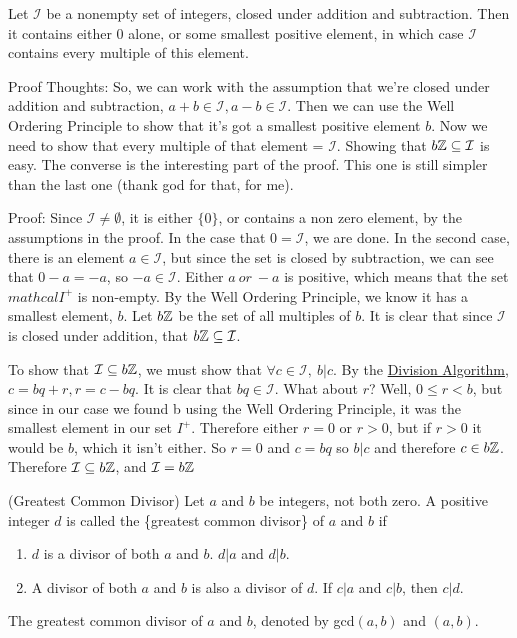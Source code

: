  Let \(\mathcal{I}\) be a nonempty set of integers, closed under addition and subtraction. Then it contains either 0 alone, or some smallest positive element, in which case \(\mathcal{I}\) contains every multiple of this element.

Proof Thoughts: So, we can work with the assumption that we're closed under addition and subtraction, \(a + b \in \mathcal{I}, a - b \in \mathcal{I}\). Then we can use the Well Ordering Principle to show that it's got a smallest positive element \(b\). Now we need to show that every multiple of that element = \(\mathcal{I}\). Showing that \(b\mathbb{Z} \subseteq \mathcal{I}\) is easy. The converse is the interesting part of the proof. This one is still simpler than the last one (thank god for that, for me).

Proof: Since \(\mathcal{I} \neq \emptyset\), it is either \(\{0\}\), or contains a non zero element, by the assumptions in the proof. In the case that \({0} = \mathcal{I}\), we are done. In the second case, there is an element \( a \in \mathcal{I}\), but since the set is closed by subtraction, we can see that \(0 - a = -a\), so \( -a \in \mathcal{I}\). Either \(a\ or\ -a \) is positive, which means that the set \(mathcal{I^+}\) is non-empty. By the Well Ordering Principle, we know it has a smallest element, \(b\). Let \(b\mathbb{Z}\) be the set of all multiples of \(b\). It is clear that since \(\mathcal{I}\) is closed under addition, that \(b\mathbb{Z} \subseteq \mathcal{I}\).

To show that \(\mathcal{I} \subseteq b\mathbb{Z}\), we must show that \(\forall c \in \mathcal{I},\ b|c\). By the \hyperref[def:1.1.3]{Division Algorithm}, \(c = bq + r, r = c - bq\). It is clear that \(bq \in \mathcal{I}\). What about \(r\)? Well, \(0 \leq r < b\), but since in our case we found b using the Well Ordering Principle, it was the smallest element in our set \(I^+\). Therefore either \(r = 0\) or \(r > 0\), but if \(r > 0\) it would be \(b\), which it isn't either. So \(r = 0\) and \( c = bq\) so \(b|c\) and therefore \(c \in b\mathbb{Z}\). Therefore \(\mathcal{I} \subseteq b\mathbb{Z}\), and \(\mathcal{I} = b\mathbb{Z}\)

 (Greatest Common Divisor) Let \(a\) and \(b\) be integers, not both zero. A positive integer \(d\) is called the \{greatest common divisor\} of \(a\) and \(b\) if
\begin{enumerate}
    \item \(d\) is a divisor of both \(a\) and \(b\). \(d|a\) and \(d|b\).
    \item A divisor of both \(a\) and \(b\) is also a divisor of \(d\). If \(c|a\) and \(c|b\), then \(c|d\).
\end{enumerate}
The greatest common divisor of \(a\) and \(b\), denoted by gcd\((a, b)\) and \((a, b)\).

